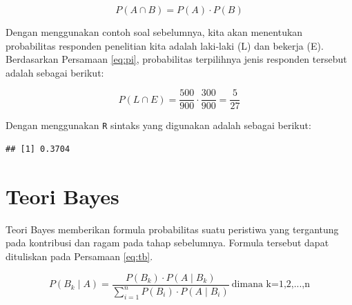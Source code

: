 \documentclass[]{book}
\newenvironment{Shaded}{\begin{snugshade}}{\end{snugshade}}
\newcommand{\KeywordTok}[1]{\textcolor[rgb]{0.13,0.29,0.53}{\textbf{#1}}}
\newcommand{\StringTok}[1]{\textcolor[rgb]{0.31,0.60,0.02}{#1}}
\newcommand{\CommentTok}[1]{\textcolor[rgb]{0.56,0.35,0.01}{\textit{#1}}}
\newcommand{\OperatorTok}[1]{\textcolor[rgb]{0.81,0.36,0.00}{\textbf{#1}}}
\newcommand{\NormalTok}[1]{#1}
\begin{document}
\begin{equation}
   P\left(A\cap B\right)=P\left(A\right)\cdot P\left(B\right)
  \label{eq:pi}
\end{equation}

Dengan menggunakan contoh soal sebelumnya, kita akan menentukan
probabilitas responden penelitian kita adalah laki-laki (L) dan bekerja
(E). Berdasarkan Persamaan \eqref{eq:pi}, probabilitas terpilihnya jenis
responden tersebut adalah sebagai berikut:

\[
P\left(L\cap E\right)=\frac{500}{900}\cdot\frac{300}{900}=\frac{5}{27}
\]

Dengan menggunakan \texttt{R} sintaks yang digunakan adalah sebagai
berikut:

\begin{Shaded}
\end{Shaded}

\begin{verbatim}
## [1] 0.3704
\end{verbatim}

\section{Teori Bayes}\label{teori-bayes}

Teori Bayes memberikan formula probabilitas suatu peristiwa yang
tergantung pada kontribusi dan ragam pada tahap sebelumnya. Formula
tersebut dapat dituliskan pada Persamaan \eqref{eq:tb}.

\begin{equation}
   P\left(B_k\mid A\right)=\frac{P\left(B_k\right)\cdot P\left(A\mid B_k\right)}{\sum_{i=1}^nP\left(B_i\right)\cdot P\left(A\mid B_i\right)}\ \text{dimana k=1,2,...,n}
  \label{eq:tb}
\end{equation}
\end{document}
